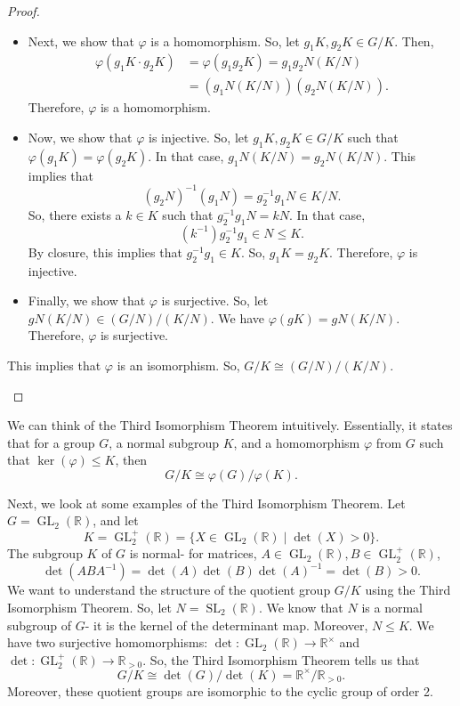 \documentclass[a4paper, openany]{memoir}
\theoremstyle{definition}
\theoremstyle{plain}
\begin{document}
\begin{proof}
\begin{itemize}
\begin{itemize}
        \item Next, we show that $\varphi$ is a homomorphism. So, let $g_1K, g_2K \in G/K$. Then,
        \begin{align*}
            \varphi(g_1K \cdot g_2K) &= \varphi(g_1g_2K) = g_1g_2N (K/N) \\
            &= (g_1N (K/N)) (g_2N (K/N)).
        \end{align*}
        Therefore, $\varphi$ is a homomorphism.
        
        \item Now, we show that $\varphi$ is injective. So, let $g_1K, g_2K \in G/K$ such that $\varphi(g_1K) = \varphi(g_2K)$. In that case, $g_1N (K/N) = g_2N (K/N)$. This implies that 
        \[(g_2N)^{-1}(g_1N) = g_2^{-1}g_1N \in K/N.\]
        So, there exists a $k \in K$ such that $g_2^{-1}g_1N = kN$. In that case, 
        \[(k^{-1})g_2^{-1}g_1 \in N \leqslant K.\]
        By closure, this implies that $g_2^{-1}g_1 \in K$. So, $g_1K = g_2K$. Therefore, $\varphi$ is injective.
        
        \item Finally, we show that $\varphi$ is surjective. So, let \\ $gN(K/N) \in (G/N)/(K/N)$. We have $\varphi(gK) = gN(K/N)$. Therefore, $\varphi$ is surjective.
    \end{itemize}
    This implies that $\varphi$ is an isomorphism. So, $G/K \cong (G/N)/(K/N)$.
\end{itemize}
\end{proof}
\noindent We can think of the Third Isomorphism Theorem intuitively. Essentially, it states that for a group $G$, a normal subgroup $K$, and a homomorphism $\varphi$ from $G$ such that $\ker (\varphi) \leqslant K$, then
\[G/K \cong \varphi(G)/\varphi(K).\]

Next, we look at some examples of the Third Isomorphism Theorem. Let $G = \operatorname{GL}_2(\mathbb{R})$, and let 
\[K = \operatorname{GL}_2^+(\mathbb{R}) = \{X \in \operatorname{GL}_2(\mathbb{R}) \mid \det(X) > 0\}.\]
The subgroup $K$ of $G$ is normal- for matrices, $A \in \operatorname{GL}_2(\mathbb{R}), B \in \operatorname{GL}_2^+(\mathbb{R})$,
\[\det(ABA^{-1}) = \det(A) \det(B) \det(A)^{-1} = \det(B) > 0.\]
We want to understand the structure of the quotient group $G/K$ using the Third Isomorphism Theorem. So, let $N = \operatorname{SL}_2(\mathbb{R})$. We know that $N$ is a normal subgroup of $G$- it is the kernel of the determinant map. Moreover, $N \leqslant K$. We have two surjective homomorphisms: $\det: \operatorname{GL}_2(\mathbb{R}) \to \mathbb{R}^\times$ and $\det: \operatorname{GL}_2^+(\mathbb{R}) \to \mathbb{R}_{> 0}$. So, the Third Isomorphism Theorem tells us that
\[G/K \cong \det(G)/\det(K) = \mathbb{R}^\times/\mathbb{R}_{> 0}.\]
Moreover, these quotient groups are isomorphic to the cyclic group of order 2.
\end{document}

